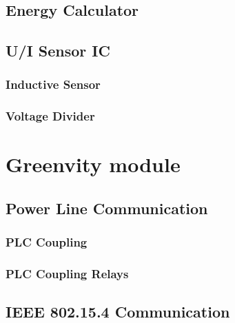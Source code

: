 \subsection{Energy Calculator}
\label{subsec: Energy Calculator}
\subsection{U/I Sensor IC}
\label{subsec: U/I Sensor IC}
\subsubsection{Inductive Sensor}
\label{subsubsec: Inductive Sensor}
\subsubsection{Voltage Divider}
\label{subsubsec: Voltage Divider}



\section{Greenvity module}
\label{sec: Greenvity module}
\subsection{Power Line Communication}
\label{subsec: Power Line Communication}
\subsubsection{PLC Coupling}
\label{subsubsec: PLC Coupling}
\subsubsection{PLC Coupling Relays}
\label{subsubsec: PLC Coupling Relays}
\subsection{IEEE 802.15.4 Communication}
\label{subsec: IEEE 802.15.4 Communication}



